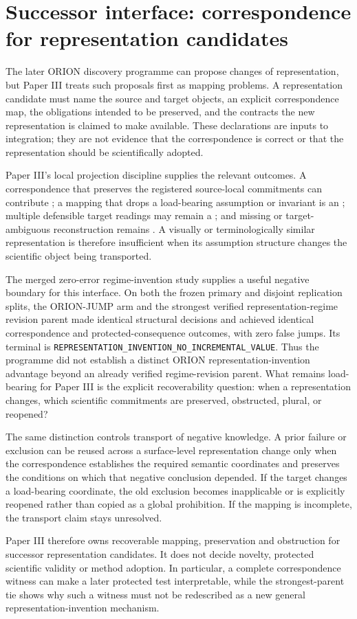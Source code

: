 \section{Successor interface: correspondence for representation candidates}
\label{sec:p3-successor-correspondence}

The later ORION discovery programme can propose changes of representation, but Paper III treats such proposals first as mapping problems. A representation candidate must name the source and target objects, an explicit correspondence map, the obligations intended to be preserved, and the contracts the new representation is claimed to make available. These declarations are inputs to integration; they are not evidence that the correspondence is correct or that the representation should be scientifically adopted.

Paper III's local projection discipline supplies the relevant outcomes. A correspondence that preserves the registered source-local commitments can contribute \glue; a mapping that drops a load-bearing assumption or invariant is an \obstruction; multiple defensible target readings may remain a \pluralview; and missing or target-ambiguous reconstruction remains \unresolved. A visually or terminologically similar representation is therefore insufficient when its assumption structure changes the scientific object being transported.

The merged zero-error regime-invention study supplies a useful negative boundary for this interface. On both the frozen primary and disjoint replication splits, the ORION-JUMP arm and the strongest verified representation-regime revision parent made identical structural decisions and achieved identical correspondence and protected-consequence outcomes, with zero false jumps. Its terminal is \texttt{REPRESENTATION\_INVENTION\_NO\_INCREMENTAL\_VALUE}. Thus the programme did not establish a distinct ORION representation-invention advantage beyond an already verified regime-revision parent. What remains load-bearing for Paper III is the explicit recoverability question: when a representation changes, which scientific commitments are preserved, obstructed, plural, or reopened?

The same distinction controls transport of negative knowledge. A prior failure or exclusion can be reused across a surface-level representation change only when the correspondence establishes the required semantic coordinates and preserves the conditions on which that negative conclusion depended. If the target changes a load-bearing coordinate, the old exclusion becomes inapplicable or is explicitly reopened rather than copied as a global prohibition. If the mapping is incomplete, the transport claim stays unresolved.

Paper III therefore owns recoverable mapping, preservation and obstruction for successor representation candidates. It does not decide novelty, protected scientific validity or method adoption. In particular, a complete correspondence witness can make a later protected test interpretable, while the strongest-parent tie shows why such a witness must not be redescribed as a new general representation-invention mechanism.